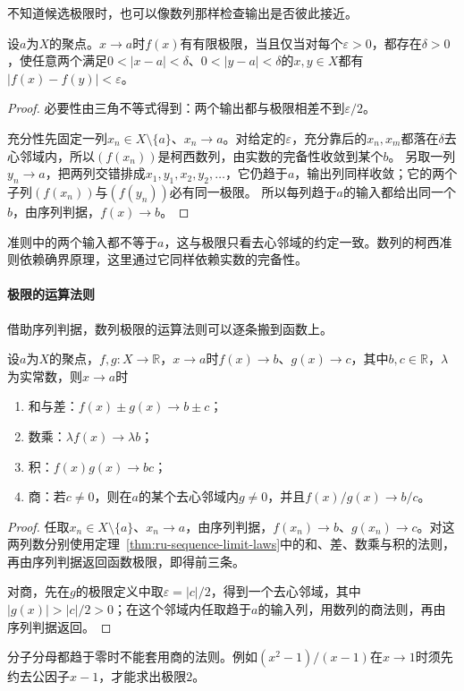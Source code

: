 不知道候选极限时，也可以像数列那样检查输出是否彼此接近。
\begin{theorem}[函数极限的柯西准则]
\label{thm:ru-function-cauchy}
设$a$为$X$的聚点。$x\to a$时$f(x)$有有限极限，当且仅当对每个$\varepsilon>0$，都存在$\delta>0$，使任意两个满足$0<|x-a|<\delta$、$0<|y-a|<\delta$的$x,y\in X$都有$|f(x)-f(y)|<\varepsilon$。
\end{theorem}
\begin{proof}
必要性由三角不等式得到：两个输出都与极限相差不到$\varepsilon/2$。

充分性先固定一列$x_n\in X\setminus\{a\}$、$x_n\to a$。对给定的$\varepsilon$，充分靠后的$x_n,x_m$都落在$\delta$去心邻域内，所以$(f(x_n))$是柯西数列，由实数的完备性收敛到某个$b$。
另取一列$y_n\to a$，把两列交错排成$x_1,y_1,x_2,y_2,\ldots$，它仍趋于$a$，输出列同样收敛；它的两个子列$(f(x_n))$与$(f(y_n))$必有同一极限。
所以每列趋于$a$的输入都给出同一个$b$，由序列判据，$f(x)\to b$。
\end{proof}
准则中的两个输入都不等于$a$，这与极限只看去心邻域的约定一致。数列的柯西准则依赖确界原理，这里通过它同样依赖实数的完备性。

\paragraph{极限的运算法则}
借助序列判据，数列极限的运算法则可以逐条搬到函数上。
\begin{theorem}[函数极限的运算法则]
\label{thm:ru-function-limit-laws}
设$a$为$X$的聚点，$f,g:X\to\mathbb R$，$x\to a$时$f(x)\to b$、$g(x)\to c$，其中$b,c\in\mathbb R$，$\lambda$为实常数，则$x\to a$时
\begin{enumerate}
 \item 和与差：$f(x)\pm g(x)\to b\pm c$；
 \item 数乘：$\lambda f(x)\to\lambda b$；
 \item 积：$f(x)g(x)\to bc$；
 \item 商：若$c\neq0$，则在$a$的某个去心邻域内$g\neq0$，并且$f(x)/g(x)\to b/c$。
\end{enumerate}
\end{theorem}
\begin{proof}
任取$x_n\in X\setminus\{a\}$、$x_n\to a$，由序列判据，$f(x_n)\to b$、$g(x_n)\to c$。对这两列数分别使用定理~\ref{thm:ru-sequence-limit-laws}中的和、差、数乘与积的法则，再由序列判据返回函数极限，即得前三条。

对商，先在$g$的极限定义中取$\varepsilon=|c|/2$，得到一个去心邻域，其中$|g(x)|>|c|/2>0$；在这个邻域内任取趋于$a$的输入列，用数列的商法则，再由序列判据返回。
\end{proof}
分子分母都趋于零时不能套用商的法则。例如$(x^2-1)/(x-1)$在$x\to1$时须先约去公因子$x-1$，才能求出极限$2$。

